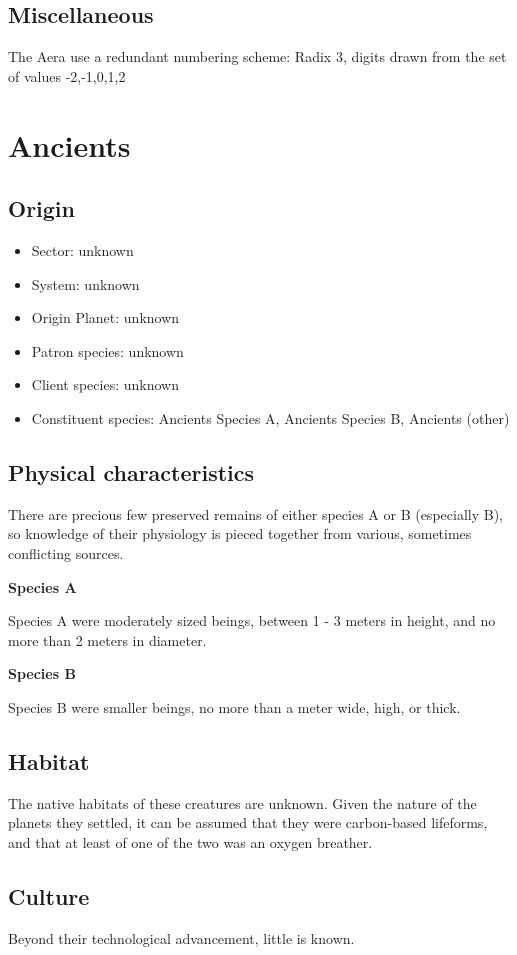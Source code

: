 \subsection{Miscellaneous}
The Aera use a redundant numbering scheme:
Radix 3, digits drawn from the set of values {-2,-1,0,1,2} 

\section{Ancients}

\subsection{Origin}
\begin{itemize}
\item Sector: unknown
\item System: unknown
\item Origin Planet: unknown
\item Patron species: unknown
\item Client species: unknown
\item Constituent species: Ancients Species A, Ancients Species B, Ancients (other)
\end{itemize}

\subsection{Physical characteristics}
There are precious few preserved remains of either species A or B
(especially B), so knowledge of their physiology is pieced together
from various, sometimes conflicting sources.

{\bf Species A}

Species A were moderately sized beings, between 1 - 3 meters in height, and no more than 2 meters in diameter. 

{\bf Species B}

Species B were smaller beings, no more than a meter wide, high, or thick. 


\subsection{Habitat}
The native habitats of these creatures are unknown. Given the nature
of the planets they settled, it can be assumed that they were
carbon-based lifeforms, and that at least of one of the two was an
oxygen breather.

\subsection{Culture}
Beyond their technological advancement, little is known. 

